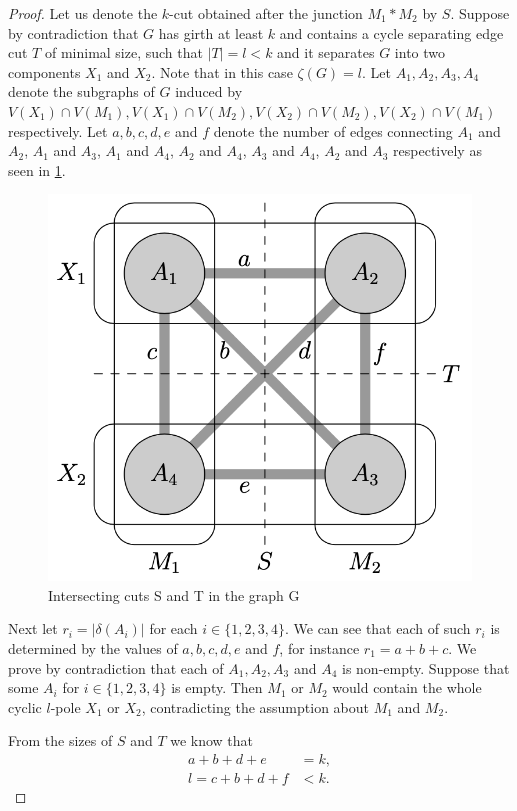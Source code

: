\documentclass[12pt, twoside]{book}
\begin{document}
\begin{proof}
	Let us denote the $k$-cut obtained after the junction $M_1*M_2$ by $S$. Suppose by contradiction that $G$ has girth at least $k$ and contains a cycle separating edge cut $T$ of minimal size, such that $|T|=l<k$ and it separates $G$ into two components $X_1$ and $X_2$. Note that in this case $\zeta(G)=l$. Let $A_1,A_2,A_3,A_4$ denote the subgraphs of $G$ induced by $V(X_1)\cap V(M_1), V(X_1)\cap V(M_2), V(X_2)\cap V(M_2), V(X_2)\cap V(M_1)$ respectively. Let $a,b,c,d,e$ and $f$ denote the number of edges connecting $A_1$ and $A_2$, $A_1$ and $A_3$, $A_1$ and $A_4$, $A_2$ and $A_4$, $A_3$ and $A_4$, $A_2$ and $A_3$ respectively as seen in \cref{fig:rajnik-cyclic-part-junction-illustration}.
	
	\begin{figure}
		\centering
		\includegraphics[width=0.5\linewidth]{graphs/rajnik-cyclic-part-junction-illustration}
		\caption{\cite{Rajnik_phd} Intersecting cuts S and T in the graph G}
		\label{fig:rajnik-cyclic-part-junction-illustration}
	\end{figure}
	
	Next let $r_i=|\delta(A_i)|$ for each $i\in\{1,2,3,4\}$. We can see that each of such $r_i$ is determined by the values of $a,b,c,d,e$ and $f$, for instance $r_1=a+b+c$. We prove by contradiction that each of $A_1, A_2,A_3$ and $A_4$ is non-empty. Suppose that some $A_i$ for $i\in\{1,2,3,4\}$ is empty. Then $M_1$ or $M_2$ would contain the whole cyclic $l$-pole $X_1$ or $X_2$, contradicting the assumption about $M_1$ and $M_2$.
	
	From the sizes of $S$ and $T$ we know that
	\begin{align}
		a+b+d+e &= k, \label{abde_eq_k}\\
		l=c+b+d+f &< k. \label{cbdf_smaller_k}
	\end{align}
	

\end{proof}
\end{document}
